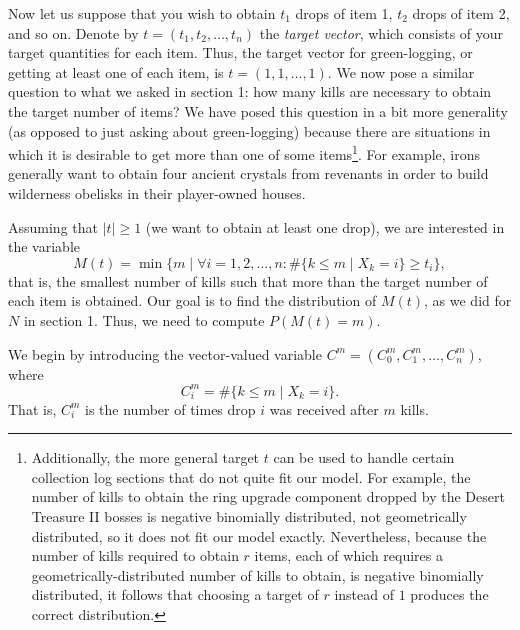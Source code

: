 \documentclass[letterpaper]{article}
\begin{document}
	Now let us suppose that you wish to obtain $t_1$ drops of item 1, $t_2$ drops of item 2, and so on. Denote by $t = (t_1, t_2, \dots, t_n)$ the \textit{target vector}, which consists of your target quantities for each item. Thus, the target vector for green-logging, or getting at least one of each item, is $t = (1,1,\dots, 1)$. We now pose a similar question to what we asked in section 1: how many kills are necessary to obtain the target number of items? We have posed this question in a bit more generality (as opposed to just asking about green-logging) because there are situations in which it is desirable to get more than one of some items\footnote{Additionally, the more general target $t$ can be used to handle certain collection log sections that do not quite fit our model. For example, the number of kills to obtain the ring upgrade component dropped by the Desert Treasure II bosses is negative binomially distributed, not geometrically distributed, so it does not fit our model exactly. Nevertheless, because the number of kills required to obtain $r$ items, each of which requires a geometrically-distributed number of kills to obtain, is negative binomially distributed, it follows that choosing a target of $r$ instead of $1$ produces the correct distribution.}. For example, irons generally want to obtain four ancient crystals from revenants in order to build wilderness obelisks in their player-owned houses.
	
	Assuming that $|t| \ge 1$ (we want to obtain at least one drop), we are interested in the variable
	\begin{equation}
		M(t) = \min\{m \mid \forall i=1,2,\dots,n : \#\{k \le m \mid X_k = i\} \ge t_i\},
	\end{equation}
	that is, the smallest number of kills such that more than the target number of each item is obtained. Our goal is to find the distribution of $M(t)$, as we did for $N$ in section 1. Thus, we need to compute $P(M(t){=}m)$. 
	
	We begin by introducing the vector-valued variable $C^m = (C_0^m, C_1^m, \dots, C_n^m)$, where
	\begin{equation}
		C_i^m = \#\{k\le m \mid X_k = i\}.
	\end{equation}
	That is, $C_i^m$ is the number of times drop $i$ was received after $m$ kills.
	
\end{document}
